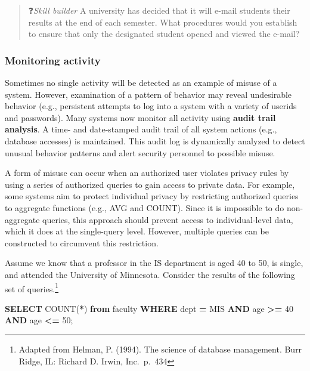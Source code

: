 \documentclass[
]{article}
\newenvironment{Shaded}{\begin{snugshade}}{\end{snugshade}}
\newcommand{\DecValTok}[1]{\textcolor[rgb]{0.00,0.00,0.81}{#1}}
\newcommand{\FunctionTok}[1]{\textcolor[rgb]{0.00,0.00,0.00}{#1}}
\newcommand{\KeywordTok}[1]{\textcolor[rgb]{0.13,0.29,0.53}{\textbf{#1}}}
\newcommand{\NormalTok}[1]{#1}
\newcommand{\OperatorTok}[1]{\textcolor[rgb]{0.81,0.36,0.00}{\textbf{#1}}}
\newcommand{\StringTok}[1]{\textcolor[rgb]{0.31,0.60,0.02}{#1}}
\begin{document}
\begin{quote}
❓\emph{Skill builder} A university has decided that it will e-mail students
their results at the end of each semester. What procedures would you
establish to ensure that only the designated student opened and viewed
the e-mail?
\end{quote}

\hypertarget{monitoring-activity}{%
\subsubsection*{Monitoring activity}\label{monitoring-activity}}

Sometimes no single activity will be detected as an example of misuse of
a system. However, examination of a pattern of behavior may reveal
undesirable behavior (e.g., persistent attempts to log into a system
with a variety of userids and passwords). Many systems now monitor all
activity using \textbf{audit trail analysis}. A time- and date-stamped audit
trail of all system actions (e.g., database accesses) is maintained.
This audit log is dynamically analyzed to detect unusual behavior
patterns and alert security personnel to possible misuse.

A form of misuse can occur when an authorized user violates privacy
rules by using a series of authorized queries to gain access to private
data. For example, some systems aim to protect individual privacy by
restricting authorized queries to aggregate functions (e.g., AVG and
COUNT). Since it is impossible to do non-aggregate queries, this
approach should prevent access to individual-level data, which it does
at the single-query level. However, multiple queries can be constructed
to circumvent this restriction.

Assume we know that a professor in the IS department is aged 40 to 50,
is single, and attended the University of Minnesota. Consider the
results of the following set of queries.\footnote{Adapted from Helman, P. (1994). The science of database
  management. Burr Ridge, IL: Richard D. Irwin, Inc.~p.~434}

\begin{Shaded}
\begin{Highlighting}[]
\KeywordTok{SELECT} \FunctionTok{COUNT}\NormalTok{(}\OperatorTok{*}\NormalTok{) }\KeywordTok{from}\NormalTok{ faculty}
    \KeywordTok{WHERE}\NormalTok{ dept }\OperatorTok{=} \StringTok{\textquotesingle{}MIS\textquotesingle{}}
    \KeywordTok{AND}\NormalTok{ age }\OperatorTok{\textgreater{}=} \DecValTok{40} \KeywordTok{AND}\NormalTok{ age }\OperatorTok{\textless{}=} \DecValTok{50}\NormalTok{; }
\end{Highlighting}
\end{Shaded}
\end{document}
